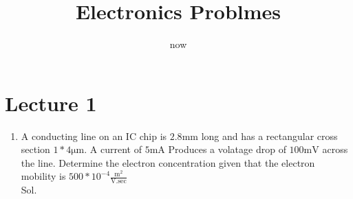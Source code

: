 \documentclass[14pt]{book}
\title{Electronics Problmes}
\date{now}
\begin{document}
\section*{Lecture 1}
\begin{enumerate}

	\item A conducting line on an IC chip is $2.8\mathrm{mm}$ long and has a rectangular cross section $1 * 4\mathrm{\mu m}$. A current of $5 \mathrm{mA}$ Produces a volatage drop of $100 \mathrm{mV}$ across the line. Determine the electron concentration given that the electron mobility is $500 * 10^{-4}\mathrm{\frac{m^2}{V.sec}}$\\
	Sol.\\ 

\end{enumerate}
\end{document}
